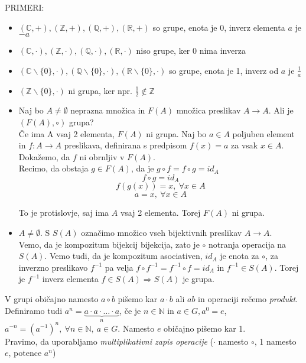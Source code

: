 \documentclass[a4paper,12pt]{article}
\begin{document}
\noindent PRIMERI: 
\begin{itemize}
\item $(\mathbb{C},+), (\mathbb{Z},+), (\mathbb{Q},+), (\mathbb{R},+)$ so grupe, enota je 0, inverz elementa $a$ je $-a$
\item $(\mathbb{C},\cdot), (\mathbb{Z},\cdot), (\mathbb{Q},\cdot), (\mathbb{R},\cdot)$ niso grupe, ker 0 nima inverza
\item $(\mathbb{C}\backslash \{ 0 \},\cdot), (\mathbb{Q}\backslash \{ 0 \},\cdot), (\mathbb{R}\backslash \{ 0 \},\cdot)$ so grupe, enota je 1, inverz od $a$ je $\frac{1}{a}$
\item $(\mathbb{Z}\backslash \{ 0 \},\cdot)$ ni grupa, ker npr. $\frac{1}{2} \notin \mathbb{Z}$
\item Naj bo $A\neq \emptyset$ neprazna množica in $F(A)$ množica preslikav $A\to A$. Ali je $(F(A),\circ)$ grupa? \\

Če ima A vsaj 2 elementa, $F(A)$ ni grupa. Naj bo $a\in A$ poljuben element in $f: A\to A$ preslikava, definirana s predpisom $f(x)=a$ za vsak $x\in A$. Dokažemo, da $f$ ni obrnljiv v $F(A)$.\\

Recimo, da obstaja $g\in F(A)$, da je $g\circ f=f \circ g=id_A$
$$f\circ g=id_A$$
$$f(g(x))=x,~\forall x \in A$$
$$ a=x,~\forall x\in A$$

To je protislovje, saj ima $A$ vsaj 2 elementa. Torej $F(A)$ ni grupa.

\item $A\neq \emptyset$. S $S(A)$ označimo množico vseh bijektivnih preslikav $A\to A$. \\

Vemo, da je kompozitum bijekcij bijekcija, zato je $\circ$ notranja operacija na $S(A)$. Vemo tudi, da je kompozitum asociativen, $id_A$ je enota za $\circ$, za inverzno preslikavo $f^{-1}$ pa velja $f\circ f^{-1}=f^{-1}\circ f=id_A$ in $f^{-1}\in S(A)$. Torej je $f^{-1}$ inverz elementa $f\in S(A) \Rightarrow S(A)$ je grupa.
\end{itemize}

\noindent V grupi običajno namesto $a\circ b$ pišemo kar $a\cdot b$ ali $ab$ in operaciji rečemo \textit{produkt}. Definiramo tudi $a^n=\underbrace{a\cdot a \cdot \ldots \cdot a}_{n}$, če je $n\in \mathbb{N}$ in $a\in G,a^0=e$, $a^{-n}=(a^{-1})^n,~\forall n\in \mathbb{N},~a\in G$. Namesto $e$ običajno pišemo kar 1. \\

\noindent Pravimo, da uporabljamo \textit{multiplikativni zapis operacije} ($\cdot$ namesto $\circ$, 1 namesto $e$, potence $a^n$) \\
\end{document}
